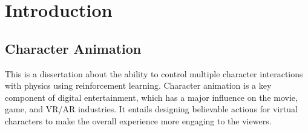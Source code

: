 \documentclass{l4proj}
\begin{document}
%
%
%

%
%
%
%
\chapter{Introduction}


\section{Character Animation}
This is a dissertation about the ability to control multiple character interactions with physics using reinforcement learning. Character animation is a key component of digital entertainment, which has a major influence on the movie, game, and VR/AR industries. It entails designing believable actions for virtual characters to make the overall experience more engaging to the viewers.
\end{document}
